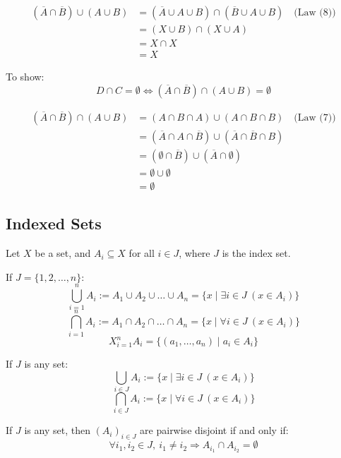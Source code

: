 \begin{align*}
	(\overline{A} \cap \overline{B}) \cup (A \cup B)
	 & = (\overline{A} \cup A \cup B) \cap (\overline{B} \cup A \cup B) \quad \text{(Law (8))} \\
	 & = (X \cup B) \cap (X \cup A)                                                            \\
	 & = X \cap X                                                                              \\
	 & = X
\end{align*}

To show:
\[
	D \cap C = \emptyset \iff (\overline{A} \cap \overline{B}) \cap (A \cup B) = \emptyset
\]

\begin{align*}
	(\overline{A} \cap \overline{B}) \cap (A \cup B)
	 & = (A \cap B \cap A) \cup (A \cap B \cap B) \quad \text{(Law (7))}                      \\
	 & = (\overline{A} \cap A \cap \overline{B}) \cup (\overline{A} \cap \overline{B} \cap B) \\
	 & = (\emptyset \cap \overline{B}) \cup (\overline{A} \cap \emptyset)                     \\
	 & = \emptyset \cup \emptyset                                                             \\
	 & = \emptyset
\end{align*}

\subsection{Indexed Sets}

Let \( X \) be a set, and \( A_i \subseteq X \) for all \( i \in J \), where \( J \) is the index set.
\vspace{\baselineskip}

If \( J = \{1, 2, \dots, n\} \):
\[
	\bigcup_{i=1}^{n} A_i := A_1 \cup A_2 \cup \dots \cup A_n = \{ x \mid \exists i \in J \ (x \in A_i) \}
\]
\[
	\bigcap_{i=1}^{n} A_i := A_1 \cap A_2 \cap \dots \cap A_n = \{ x \mid \forall i \in J \ (x \in A_i) \}
\]
\[
	X_{i=1}^{n} A_i = \{(a_1, \dots, a_n) \mid a_i \in A_i \}
\]

If \( J \) is any set:
\[
	\bigcup_{i \in J} A_i := \{ x \mid \exists i \in J \ (x \in A_i) \}
\]
\[
	\bigcap_{i \in J} A_i := \{ x \mid \forall i \in J \ (x \in A_i) \}
\]

If \( J \) is any set, then \( {(A_i)}_{i \in J} \) are pairwise disjoint if and only if:
\[
	\forall i_1, i_2 \in J, \ i_1 \neq i_2 \Rightarrow A_{i_1} \cap A_{i_2} = \emptyset
\]

